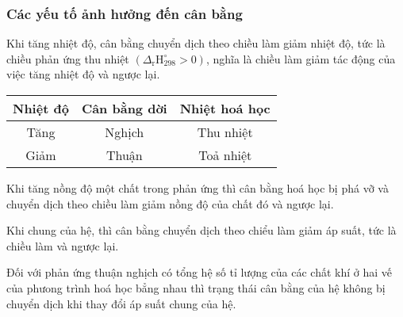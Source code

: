\subsubsection{Các yếu tố ảnh hưởng đến cân bằng}
\vspace{0.5cm}
\begin{paracol}{2}
	\begin{tomtat}
	Khi tăng nhiệt độ, cân bằng chuyển dịch theo chiều làm giảm nhiệt độ, tức là chiều phản ứng thu nhiệt $\left(\Delta_{\mathrm{r}} \mathrm{H}_{298}^{\circ}>0\right)$, nghĩa là chiều làm giảm tác động của việc tăng nhiệt độ và ngược lại.
\end{tomtat}
\switchcolumn
	\begin{tabular}{|c|c|c|}
		\hline Nhiệt độ & Cân bằng dời & Nhiệt hoá học \\
		\hline Tăng & Nghịch & Thu nhiệt \\
		\hline Giảm & Thuận & Toả nhiệt \\
		\hline
	\end{tabular}
\end{paracol}

\vspace{0.5cm}
\begin{tomtat}
	Khi tăng nồng độ một chất trong phản ứng thì cân bằng hoá học bị phá vỡ và chuyển dịch theo chiều làm giảm nồng độ của chất đó và ngược lại.
\end{tomtat}

\vspace{0.5cm}
\begin{tomtat}
	Khi  chung của hệ, thì cân bằng chuyển dịch theo chiểu làm giảm áp suất, tức là chiều làm  và ngược lại.
	
	Đối với phản ứng thuận nghịch có tổng hệ số tỉ lượng của các chất khí ở hai vế của phưong trình hoá học bẳng nhau thì trạng thái cân bằng của hệ không bị chuyển dịch khi thay đổi áp suất chung của hệ.
\end{tomtat}
